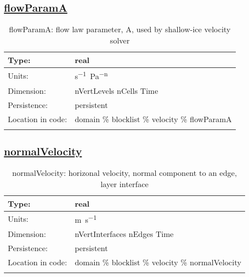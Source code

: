 \subsection[flowParamA]{\hyperref[sec:var_tab_velocity]{flowParamA}}
\label{subsec:var_sec_velocity_flowParamA}
\begin{center}
\begin{longtable}{| p{2.0in} | p{4.0in} |}
        \hline 
        Type: & real \\
        \hline 
        Units: & \si{s^{-1}.Pa^{-n}} \\
        \hline 
        Dimension: & nVertLevels nCells Time \\
        \hline 
        Persistence: & persistent \\
        \hline 
         Location in code: & domain \% blocklist \% velocity \% flowParamA \\
         \hline 
    \caption{flowParamA: flow law parameter, A, used by shallow-ice velocity solver}
\end{longtable}
\end{center}
\subsection[normalVelocity]{\hyperref[sec:var_tab_velocity]{normalVelocity}}
\label{subsec:var_sec_velocity_normalVelocity}
\begin{center}
\begin{longtable}{| p{2.0in} | p{4.0in} |}
        \hline 
        Type: & real \\
        \hline 
        Units: & \si{m.s^{-1}} \\
        \hline 
        Dimension: & nVertInterfaces nEdges Time \\
        \hline 
        Persistence: & persistent \\
        \hline 
         Location in code: & domain \% blocklist \% velocity \% normalVelocity \\
         \hline 
    \caption{normalVelocity: horizonal velocity, normal component to an edge, layer interface}
\end{longtable}
\end{center}
